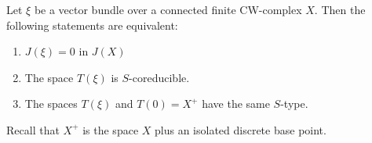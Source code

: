 Let $\xi$ be a vector bundle over a connected finite CW-complex $X$. Then the following statements are equivalent:
\begin{enumerate}
\item[(1)] $J(\xi) = 0$ in $J(X)$
\item[(2)] The space $T(\xi)$ is $S$-coreducible.
\item[(3)] The spaces $T(\xi)$ and $T(0) = X^+$ have the same $S$-type.
\end{enumerate}
Recall that $X^+$ is the space $X$ plus an isolated discrete base point.
